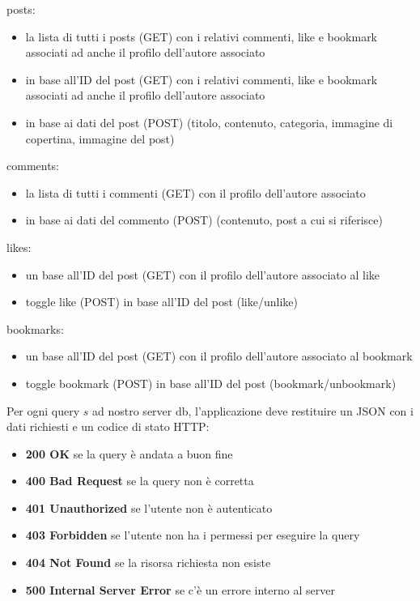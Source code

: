 \documentclass{article}
\begin{document}
posts:
\begin{itemize}
    \item la lista di tutti i posts (GET) con i relativi commenti, like e bookmark associati ad anche il profilo dell'autore associato
    \item in base all'ID del post (GET) con i relativi commenti, like e bookmark associati ad anche il profilo dell'autore associato
    \item in base ai dati del post (POST) (titolo, contenuto, categoria, immagine di copertina, immagine del post)
\end{itemize}

comments:
\begin{itemize}
    \item la lista di tutti i commenti (GET) con il profilo dell'autore associato
    \item in base ai dati del commento (POST) (contenuto, post a cui si riferisce)
\end{itemize}

likes:
\begin{itemize}
    \item un base all'ID del post (GET) con il profilo dell'autore associato al like
    \item toggle like (POST) in base all'ID del post (like/unlike)
\end{itemize}

bookmarks:
\begin{itemize}
    \item un base all'ID del post (GET) con il profilo dell'autore associato al bookmark
    \item toggle bookmark (POST) in base all'ID del post (bookmark/unbookmark)
\end{itemize}

Per ogni query $s$ ad nostro server db, l'applicazione deve restituire un JSON con i dati richiesti e un codice di stato HTTP:
\begin{itemize}
    \item \textbf{200 OK} se la query è andata a buon fine
    \item \textbf{400 Bad Request} se la query non è corretta
    \item \textbf{401 Unauthorized} se l'utente non è autenticato
    \item \textbf{403 Forbidden} se l'utente non ha i permessi per eseguire la query
    \item \textbf{404 Not Found} se la risorsa richiesta non esiste
    \item \textbf{500 Internal Server Error} se c'è un errore interno al server
\end{itemize}
\end{document}
